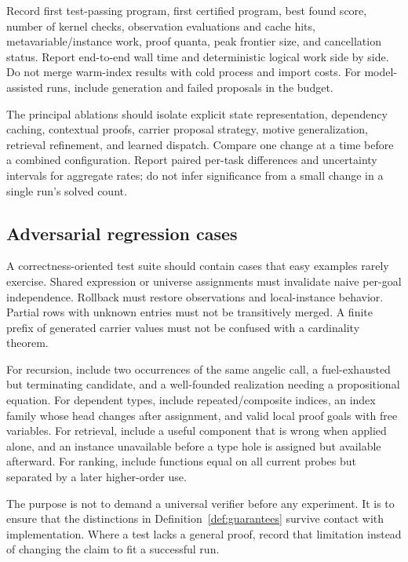 \documentclass[11pt,a4paper]{article}
\theoremstyle{definition}
\theoremstyle{remark}
\begin{document}
Record first test-passing program, first certified program, best found score, number of kernel checks, observation evaluations and cache hits, metavariable/instance work, proof quanta, peak frontier size, and cancellation status. Report end-to-end wall time and deterministic logical work side by side. Do not merge warm-index results with cold process and import costs. For model-assisted runs, include generation and failed proposals in the budget.

The principal ablations should isolate explicit state representation, dependency caching, contextual proofs, carrier proposal strategy, motive generalization, retrieval refinement, and learned dispatch. Compare one change at a time before a combined configuration. Report paired per-task differences and uncertainty intervals for aggregate rates; do not infer significance from a small change in a single run's solved count.

\subsection{Adversarial regression cases}

A correctness-oriented test suite should contain cases that easy examples rarely exercise. Shared expression or universe assignments must invalidate naive per-goal independence. Rollback must restore observations and local-instance behavior. Partial rows with unknown entries must not be transitively merged. A finite prefix of generated carrier values must not be confused with a cardinality theorem.

For recursion, include two occurrences of the same angelic call, a fuel-exhausted but terminating candidate, and a well-founded realization needing a propositional equation. For dependent types, include repeated/composite indices, an index family whose head changes after assignment, and valid local proof goals with free variables. For retrieval, include a useful component that is wrong when applied alone, and an instance unavailable before a type hole is assigned but available afterward. For ranking, include functions equal on all current probes but separated by a later higher-order use.

The purpose is not to demand a universal verifier before any experiment. It is to ensure that the distinctions in Definition~\ref{def:guarantees} survive contact with implementation. Where a test lacks a general proof, record that limitation instead of changing the claim to fit a successful run.
\end{document}
